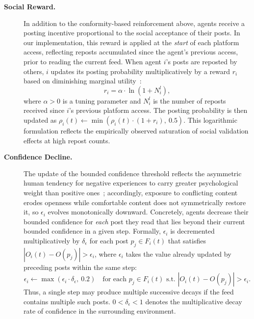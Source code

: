 \documentclass[pdflatex,sn-mathphys-num]{sn-jnl}%
\theoremstyle{thmstyleone}%
\theoremstyle{thmstyletwo}%
\theoremstyle{thmstylethree}%
\def\dgreen#1{\textcolor[rgb]{0.02,0.55,0.04}{#1}}
\def\Black{\color[rgb]{0,0,0}}
\def\post{\rho} %
\def\BoundedConfidence{\epsilon}
\begin{document}
\begin{description}
\item[{\bf Social Reward.}] In addition to the conformity-based reinforcement above,
  agents receive a posting incentive proportional to the social acceptance of their posts.
  In our implementation, this reward is applied at the \emph{start} of each platform access, reflecting reposts accumulated since the agent's previous access, prior to reading the current feed.
  When agent $i$'s posts are reposted by others, $i$ updates its posting probability
  multiplicatively by a reward $r_i$ based on diminishing marginal utility~\cite{Hermann1983}:
  \begin{equation}\label{eq:SocialReward}
    r_i = \alpha \cdot \ln(1 + N^{l}_i),
  \end{equation}
  where $\alpha > 0$ is a tuning parameter and $N^{l}_i$ is the number of reposts received
  since $i$'s previous platform access. The posting probability is then updated as
  $\post_i(t) \leftarrow \min(\post_i(t) \cdot (1 + r_i),\ 0.5)$.
  This logarithmic formulation reflects the empirically observed saturation of social
  validation effects at high repost counts.
\Black

\item[{\bf Confidence Decline.}]
\dgreen{The update of the bounded confidence threshold reflects the asymmetric
  human tendency for negative experiences to carry greater psychological weight
  than positive ones~\cite{Vallone1985,Baumeister2001}; accordingly, exposure to
  conflicting content erodes openness while comfortable content does not
  symmetrically restore it, so $\BoundedConfidence_i$ evolves monotonically
  downward. Concretely, agents decrease their bounded
  confidence for \emph{each} post they read that lies beyond their current bounded confidence in a given step.
  Formally, $\BoundedConfidence_i$ is decremented multiplicatively by $\delta_{\BoundedConfidence}$ for each post $p_j \in F_i(t)$ that satisfies $|O_i(t) - O(p_j)| > \BoundedConfidence_i$, where $\BoundedConfidence_i$ takes the value already updated by preceding posts within the same step:
  \begin{equation}
    \BoundedConfidence_i \leftarrow \max(\BoundedConfidence_i \cdot \delta_{\BoundedConfidence},\ 0.2)
    \quad \text{for each } p_j \in F_i(t) \text{ s.t. } |O_i(t) - O(p_j)| > \BoundedConfidence_i.
  \end{equation}
  Thus, a single step may produce multiple successive decays if the feed contains multiple such posts.
  $0 < \delta_{\BoundedConfidence} < 1$ denotes the multiplicative decay rate of confidence in the surrounding environment.
  }
\end{description}
\end{document}
